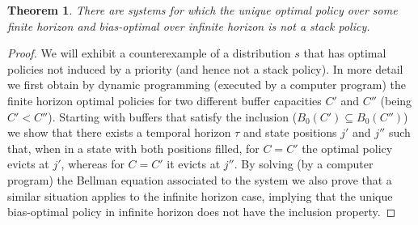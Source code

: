 \documentclass[11pt,a4paper]{article}
\newtheorem{theorem}{Theorem}
\theoremstyle{definition}
\theoremstyle{remark}
\begin{document}
\begin{theorem}\label{nonbias}
  There are systems for which the unique optimal policy over some finite horizon
  and bias-optimal over infinite horizon is not a stack policy.
    \end{theorem}
\begin{proof}  We will exhibit a counterexample of a distribution $s$ that has optimal
  policies not induced by a priority (and hence not a stack policy). In more
  detail we first obtain by dynamic programming (executed by a computer program)
  the finite horizon optimal policies for two different buffer capacities $C'$
  and $C''$ (being $C' < C''$). Starting with buffers that satisfy the inclusion
  ($B_0(C') \subseteq B_0(C'')$) we show that there exists a temporal horizon $\tau$
  and state positions $j'$ and $j''$ such that, when in a state with both
  positions filled, for $C=C'$ the optimal policy evicts at $j'$, whereas for
  $C=C'$ it evicts at $j''$.
    By solving (by a computer program) the Bellman equation associated to the
  system we also prove that a similar situation applies to the infinite horizon
  case, implying that the unique bias-optimal policy in infinite horizon does
  not have the inclusion property.


\end{proof}
\end{document}
